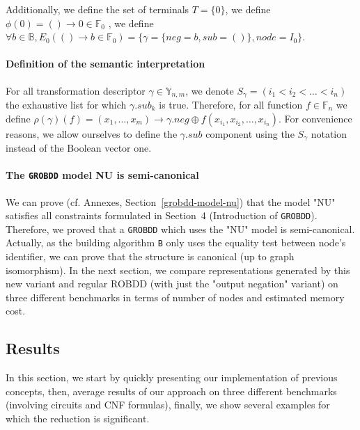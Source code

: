 \documentclass[a4paper,10pt]{article}
\newcommand{\B}{\mathbb{B}}
\newcommand{\F}{\mathbb{F}}
\newcommand{\Y}{\mathbb{Y}}
\newcommand{\GroBdd}{\texttt{GROBDD}}
\begin{document}
Additionally, we define the set of terminals $T=\{0\}$, we define $\phi(0)=()\longrightarrow{}0\in\F_0$ , we define $\forall b\in\B, E_0(()\longrightarrow b\in\F_0) = \{\gamma = \{neg = b, sub = ()\}, node = I_0\}$.

\paragraph{Definition of the semantic interpretation}

For all transformation descriptor $\gamma\in\Y_{n, m}$, we denote $S_\gamma = \left(i_1 < i_2 < \dots < i_n\right)$ the exhaustive list for which $\gamma.sub_k$ is true.
Therefore, for all function $f\in\F_n$ we define $\rho(\gamma)(f) = (x_1, \dots, x_m) \longrightarrow \gamma.neg \oplus f(x_{i_1}, x_{i_2}, \dots, x_{i_n})$.
For convenience reasons, we allow ourselves to define the $\gamma.sub$ component using the $S_\gamma$ notation instead of the Boolean vector one.


  
\paragraph{The \GroBdd{} model NU is semi-canonical}
We can prove (cf. Annexes, Section~\ref{grobdd-model-nu}) that the model "NU" satisfies all constraints formulated in Section~4 (Introduction of \GroBdd{}).
Therefore, we proved that a \GroBdd{} which uses the "NU" model is semi-canonical.
Actually, as the building algorithm \texttt{B} only uses the equality test between node's identifier, we can prove that the structure is canonical (up to graph isomorphism).
In the next section, we compare representations generated by this new variant and regular ROBDD (with just the "output negation" variant) on three different benchmarks in terms of number of nodes and estimated memory cost.

\subsection{Results}
In this section, we start by quickly presenting our implementation of previous concepts, then, average results of our approach on three different benchmarks (involving circuits and CNF formulas), finally, we show several examples for which the reduction is significant.
\end{document}

